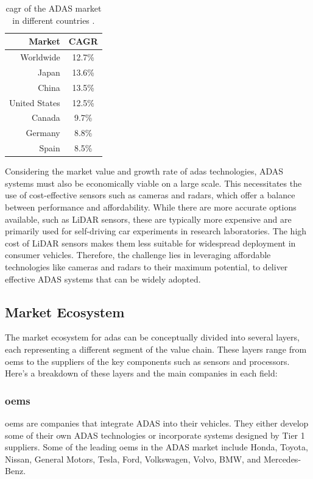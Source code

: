 \begin{table}[h]
    \centering
    \begin{tabular}{r|c}
        \hline
        \textbf{Market} & \textbf{CAGR} \\
        \hline
        Worldwide & 12.7\% \\
        Japan & 13.6\% \\
        China & 13.5\% \\
        United States & 12.5\% \\
        Canada & 9.7\% \\
        Germany & 8.8\% \\
        Spain & 8.5\% \\
        \hline
    \end{tabular}
    \caption[CAGR of the ADAS market in different countries]
    {\ac{cagr} of the ADAS market in different countries \cite{adas_report_2023}.}
    \label{tab:adas_revenue}
\end{table}
Considering the market value and growth rate of \ac{adas} technologies, 
ADAS systems must also be economically viable on a large scale. 
This necessitates the use of cost-effective sensors such as cameras and radars, 
which offer a balance between performance and affordability. While there are 
more accurate options available, such as LiDAR sensors, these are typically more 
expensive and are primarily used for self-driving car experiments in research 
laboratories. The high cost of LiDAR sensors makes them less suitable for 
widespread deployment in consumer vehicles. Therefore, the challenge lies in 
leveraging affordable technologies like cameras and radars to their maximum 
potential, to deliver effective ADAS systems that can be widely adopted.

\subsection{Market Ecosystem}
The market ecosystem for \ac{adas} can be 
conceptually divided into several layers, each representing a different segment 
of the value chain. These layers range from \acp*{oem} to the suppliers of the key 
components such as sensors and processors. 
Here's a breakdown of these layers and the main companies in each field:

\subsubsection*{\acp{oem}}
\aclp{oem} are companies that integrate ADAS into their vehicles. They either develop 
some of their own ADAS technologies or incorporate systems designed by 
Tier 1 suppliers. Some of the leading \acsp{oem} in the ADAS market include 
Honda, Toyota, Nissan, General Motors, Tesla, Ford, Volkswagen, Volvo, BMW, and 
Mercedes-Benz.

